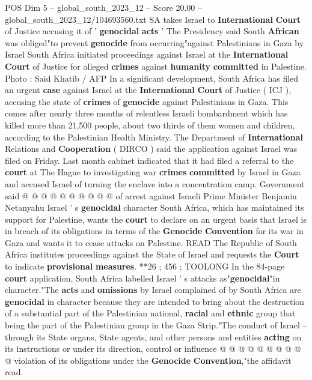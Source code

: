 \begin{textsample}{POS Dim 5 – global\_south\_2023\_12 – Score 20.00 – global\_south\_2023\_12/104693560.txt}  \label{ex:f5_pos_211}
SA takes Israel to \textbf{International} \textbf{Court} of Justice accusing it of ' \textbf{genocidal} \textbf{acts} ' The Presidency said South \textbf{African} was obliged"to prevent \textbf{genocide} from occurring"against Palestinians in Gaza by Israel South Africa initiated proceedings against Israel at the \textbf{International} \textbf{Court} of Justice for alleged \textbf{crimes} against \textbf{humanity} \textbf{committed} in Palestine.
Photo : Said Khatib / AFP In a significant development, South Africa has filed an urgent \textbf{case} against Israel at the \textbf{International} \textbf{Court} of Justice ( ICJ ), accusing the state of \textbf{crimes} of \textbf{genocide} against Palestinians in Gaza.
This comes after nearly three months of relentless Israeli bombardment which has killed more than 21,500 people, about two thirds of them women and children, according to the Palestinian Health Ministry.
The Department of \textbf{International} Relations and \textbf{Cooperation} ( DIRCO ) said the application against Israel was filed on Friday.
Last month cabinet indicated that it had filed a referral to the \textbf{court} at The Hague to investigating war \textbf{crimes} \textbf{committed} by Israel in Gaza and accused Israel of turning the enclave into a concentration camp.
Government said @ @ @ @ @ @ @ @ @ @ of arrest against Israeli Prime Minister Benjamin Netanyahu Israel ' s \textbf{genocidal} character South Africa, which has maintained its support for Palestine, wants the \textbf{court} to declare on an urgent basis that Israel is in breach of its obligations in terms of the \textbf{Genocide} \textbf{Convention} for its war in Gaza and wants it to cease attacks on Palestine.
READ The Republic of South Africa institutes proceedings against the State of Israel and requests the \textbf{Court} to indicate \textbf{provisional} \textbf{measures}. **26 ; 456 ; TOOLONG In the 84-page \textbf{court} application, South Africa labelled Israel ' s attacks as"\textbf{genocidal}"in character."The \textbf{acts} and \textbf{omissions} by Israel complained of by South Africa are \textbf{genocidal} in character because they are intended to bring about the destruction of a substantial part of the Palestinian national, \textbf{racial} and \textbf{ethnic} group that being the part of the Palestinian group in the Gaza Strip."The conduct of Israel -- through its State organs, State agents, and other persons and entities \textbf{acting} on its instructions or under its direction, control or influence @ @ @ @ @ @ @ @ @ @ violation of its obligations under the \textbf{Genocide} \textbf{Convention},"the affidavit read.

\end{textsample}

